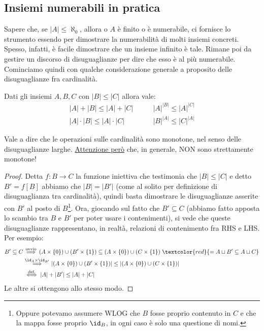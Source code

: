 \documentclass[11pt]{scrartcl}
\begin{document}
\subsection{Insiemi numerabili in pratica}
Sapere che, se $|A| \leq \aleph_0$, allora o $A$ è finito o è numerabile, ci fornisce lo strumento essendo per dimostrare la numerabilità di molti insiemi concreti. Spesso, infatti,
è facile dimostrare che un insieme infinito è tale. Rimane poi da gestire un discorso di disuguaglianze per dire che esso è al più numerabile.\\
Cominciamo quindi con qualche considerazione generale a proposito delle disuguaglianze fra cardinalità.

\begin{remark}
	\label{compatibilità_operazioni_cardinalità}
	Dati gli insiemi $A,B,C$ con $|B| \leq |C|$ allora vale:
	\begin{align*}
		|A| + |B| \leq |A| + |C| \qquad & |A|^{|B|} \leq |A|^{|C|} \\
		|A| \cdot |B| \leq |A| \cdot |C| \qquad & |B|^{|A|} \leq |C|^{|A|}
	\end{align*}
\end{remark}

Vale a dire che le operazioni sulle cardinalità sono monotone, nel senso delle disuguaglianze larghe. \underline{Attenzione però} che, in generale, NON sono strettamente monotone!

\begin{proof}
	Detta $f : B \rightarrow C$ la funzione iniettiva che testimonia che $|B| \leq |C|$ e detto $B' = f[B]$ abbiamo che $|B| = |B'|$ (come al solito per definizione di disuguaglianza
	tra cardinalità), quindi basta dimostrare le disuguaglianze asserite con $B'$ al posto di $B$\footnote{Oppure potevamo assumere WLOG che $B$ fosse proprio contenuto in $C$ e che la mappa
	fosse proprio $\id_B$, in ogni caso è solo una questione di nomi.}. Ora, giocando sul fatto che $B' \subseteq C$ (abbiamo fatto apposta lo scambio tra $B$ e $B'$ per poter usare i contenimenti),
	si vede che queste disuguaglianze rappresentano, in realtà, relazioni di contenimento fra RHS e LHS. Per esempio:
	\[ \begin{split}
		B' \subseteq C &\overset{\text{ovvio}}{\implies} (A \times \{0\}) \cup (B' \times \{1\}) \subseteq (A \times \{0\}) \cup (C \times \{1\}) \; \textcolor{red}{= A \sqcup B' \subseteq A \sqcup C}\\
					   &\overset{\id_A \times \id_{B'}}{\implies} |(A \times \{0\}) \cup (B' \times \{1\})| \leq |(A \times \{0\}) \cup (C \times \{1\})| \\
					   &\overset{\text{def.}}{\iff}|A| + |B'| \leq |A| + |C|
	\end{split}
		\]
	Le altre si ottengono allo stesso modo.
\end{proof}
\end{document}
